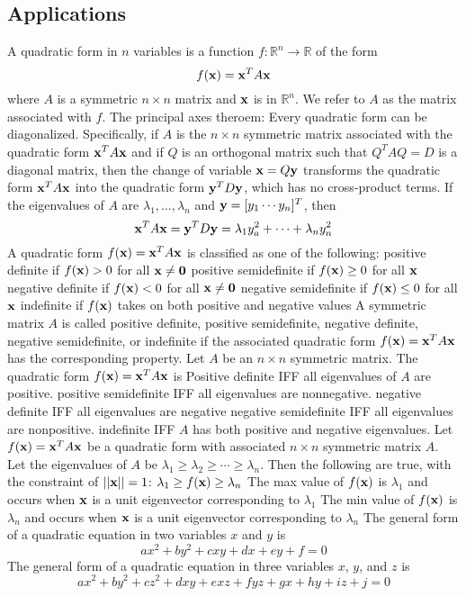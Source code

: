\documentclass{article}
\begin{document}
        \subsection{Applications}
        \begin{outline}
            \1 A quadratic form in $n$ variables is a function \(f:\mathbb R^n\to\mathbb R\) of the form \[f(\vb x)=\vb x^TA\vb x\] where $A$ is a symmetric \(n\times n\) matrix and \(\vb x\) is in \(\mathbb R^n\). We refer to $A$ as the matrix associated with $f$. 
            \1 The principal axes theroem: Every quadratic form can be diagonalized. Specifically, if $A$ is the \(n\times n\) symmetric matrix associated with the quadratic form \(\vb x^TA\vb x\) and if $Q$ is an orthogonal matrix such that \(Q^TAQ=D\) is a diagonal matrix, then the change of variable \(\vb x=Q\vb y\) transforms the quadratic form \(\vb x^TA\vb x\) into the quadratic form \(\vb y^TD\vb y\), which has no cross-product terms. If the eigenvalues of $A$ are \(\lambda_1,\ldots,\lambda_n\) and \(\vb y=[y_1\cdots y_n]^T\), then \[\vb x^TA\vb x=\vb y^TD\vb y=\lambda_1y_a^2+\cdots+\lambda_ny_n^2\]
            \1 A quadratic form \(f(\vb x)=\vb x^TA\vb x\) is classified as one of the following: 
                \2 positive definite if \(f(\vb x)>0\) for all \(\vb x\neq\vb 0\)
                \2 positive semidefinite if \(f(\vb x)\geq0\) for all \(\vb x\)
                \2 negative definite if \(f(\vb x)<0\) for all \(\vb x\neq\vb 0\)
                \2 negative semidefinite if \(f(\vb x)\leq0\) for all \(\vb x\)
                \2 indefinite if \(f(\vb x)\) takes on both positive and negative values
            \1 A symmetric matrix $A$ is called positive definite, positive semidefinite, negative definite, negative semidefinite, or indefinite if the associated quadratic form \(f(\vb x)=\vb x^TA\vb x\) has the corresponding property. 
            \1 Let $A$ be an \(n\times n\) symmetric matrix. The quadratic form \(f(\vb x)=\vb x^TA\vb x\) is 
                \2 Positive definite IFF all eigenvalues of $A$ are positive. 
                \2 positive semidefinite IFF all eigenvalues are nonnegative. 
                \2 negative definite IFF all eigenvalues are negative
                \2 negative semidefinite IFF all eigenvalues are nonpositive. 
                \2 indefinite IFF $A$ has both positive and negative eigenvalues. 
            \1 Let \(f(\vb x)=\vb x^TA\vb x\) be a quadratic form with associated \(n\times n\) symmetric matrix $A$. Let the eigenvalues of $A$ be \(\lambda_1\geq\lambda_2\geq\cdots\geq\lambda_n\). Then the following are true, with the constraint of \(||\vb x||=1\): 
                \2 \(\lambda_1\geq f(\vb x)\geq\lambda_n\)
                \2 The max value of \(f(\vb x)\) is \(\lambda_1\) and occurs when \(\vb x\) is a unit eigenvector corresponding to \(\lambda_1\)
                \2 The min value of \(f(\vb x)\) is \(\lambda_n\) and occurs when \(\vb x\) is a unit eigenvector corresponding to \(\lambda_n\)
            \1 The general form of a quadratic equation in two variables $x$ and $y$ is \[ax^2+by^2+cxy+dx+ey+f=0\]
            \1 The general form of a quadratic equation in three variables $x$, $y$, and $z$ is \[ax^2+by^2+cz^2+dxy+exz+fyz+gx+hy+iz+j=0\]

        \end{outline}
\end{document}
